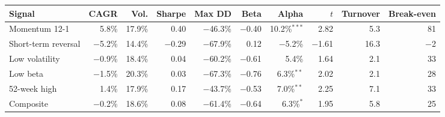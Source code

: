 \begin{tabular}{lrrrrrrrrr}
\toprule
Signal & CAGR & Vol. & Sharpe & Max DD & Beta & Alpha & $t$ & Turnover & Break-even \\
\midrule
Momentum 12-1 & 5.8\% & 17.9\% & 0.40 & $-$46.3\% & $-$0.40 & 10.2\%$^{***}$ & 2.82 & 5.3 & 81 \\
Short-term reversal & $-$5.2\% & 14.4\% & $-$0.29 & $-$67.9\% & 0.12 & $-$5.2\% & $-$1.61 & 16.3 & $-$2 \\
Low volatility & $-$0.9\% & 18.4\% & 0.04 & $-$60.2\% & $-$0.61 & 5.4\% & 1.64 & 2.1 & 33 \\
Low beta & $-$1.5\% & 20.3\% & 0.03 & $-$67.3\% & $-$0.76 & 6.3\%$^{**}$ & 2.02 & 2.1 & 28 \\
52-week high & 1.4\% & 17.9\% & 0.17 & $-$43.7\% & $-$0.53 & 7.0\%$^{**}$ & 2.25 & 7.1 & 33 \\
\midrule
Composite & $-$0.2\% & 18.6\% & 0.08 & $-$61.4\% & $-$0.64 & 6.3\%$^{*}$ & 1.95 & 5.8 & 25 \\
\bottomrule
\end{tabular}
